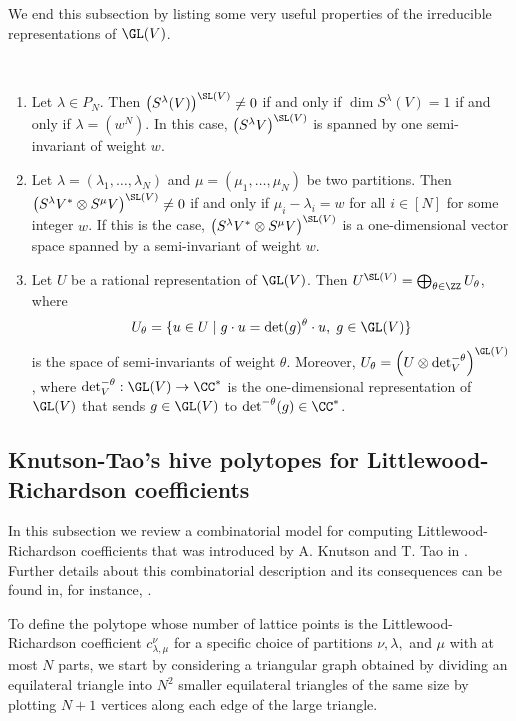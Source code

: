 We end this subsection by listing some very useful properties of the irreducible representations of $\GL(V)$. 

\begin{prop}\ \label{irr-gln-prop}
\begin{enumerate}
\item \hypertarget{irr-gln-prop-1}{} Let $\lambda \in P_N$. Then $\left(S^\lambda(V)\right)^{\SL(V)} \neq 0$ if and only if $\dim S^\lambda (V) = 1$ if and only if $\lambda = (w^N)$. In this case, $\left(S^\lambda V\right)^{\SL(V)}$ is spanned by one semi-invariant of weight $w$.
\item  \hypertarget{irr-gln-prop-2}{}  Let $\lambda = (\lambda_1,\ldots, \lambda_N)$ and $\mu = (\mu_1,\ldots, \mu_N)$ be two partitions. Then $\left(S^\lambda V^* \otimes S^\mu V\right)^{\SL(V)} \neq 0$ if and only if $\mu_i-\lambda_i=w$ for all $i \in [N]$ for some integer $w$. If this is the case, $\left(S^\lambda V^* \otimes S^\mu V\right)^{\SL(V)}$ is a one-dimensional vector space spanned by a semi-invariant of weight $w$.
\item \hypertarget{irr-gln-prop-3}{}  Let $U$ be a rational representation of $\GL(V)$. Then $U^{\SL(V)} = \bigoplus_{\theta \in \ZZ} U_\theta$, where
\[
U_\theta = \{u \in U \mid g \cdot u = \det(g)^\theta \cdot u, \; g \in \GL(V)\}
\]
is the space of semi-invariants of weight $\theta$. Moreover, $U_\theta = \left(U \otimes \det^{-\theta}_V\right)^{\GL(V)}$, where $\det^{-\theta}_V : \GL(V) \to \CC^*$ is the one-dimensional representation of $\GL(V)$ that sends $g \in \GL(V)$ to $\det^{-\theta}(g) \in \CC^*$.
\end{enumerate}
\end{prop}
	
\subsection{Knutson-Tao's hive polytopes for Littlewood-Richardson coefficients}
\label{subsection:hives}
In this subsection we review a combinatorial model for computing Littlewood-Richardson coefficients that was introduced by A. Knutson and T. Tao in \cite{KT, KT2}. Further details about this combinatorial description and its consequences can be found in, for instance, \cite{KTT, KTT2, KTT3, KTT4}.

To define the polytope whose number of lattice points is the Littlewood-Richardson coefficient $c^\nu_{\lambda,\mu}$ for a specific choice of partitions $\nu,\lambda,$ and $\mu$ with at most $N$ parts, we start by considering a triangular graph obtained by dividing an equilateral triangle into $N^2$ smaller equilateral triangles of the same size by plotting $N+1$ vertices along each edge of the large triangle.  

